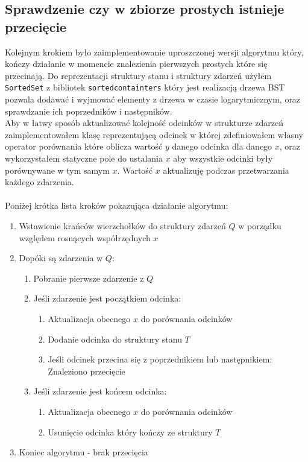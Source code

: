 \documentclass[a4paper]{article}
\begin{document}
\subsection{Sprawdzenie czy w zbiorze prostych istnieje przecięcie}
    Kolejnym krokiem było zaimplementowanie uproszczonej wersji algorytmu który, kończy działanie w momencie 
    znalezienia pierwszych prostych które się przecinają. Do reprezentacji struktury stanu i struktury zdarzeń
    użyłem \verb|SortedSet| z bibliotek \verb|sortedcontainters| który jest realizacją drzewa BST 
    pozwala dodawać i wyjmować elementy z drzewa w czasie logarytmicznym, oraz sprawdzanie ich poprzedników 
    i następników.\\
    Aby w łatwy sposób aktualizować kolejność odcinków w strukturze zdarzeń zaimplementowałem klasę reprezentującą
    odcinek w której zdefiniowałem własny operator porównania które oblicza wartość $y$ danego odcinka dla danego $x$,
    oraz wykorzystałem statyczne pole do ustalania $x$ aby wszystkie odcinki były porównywane w tym samym $x$. 
    Wartość $x$ aktualizuję podczas przetwarzania każdego zdarzenia.\\
    \\
    Poniżej krótka lista kroków pokazująca działanie algorytmu:
    
    \begin{enumerate}
        \item Wstawienie krańców wierzchołków do struktury zdarzeń $Q$ w porządku względem rosnących współrzędnych $x$
        \item Dopóki są zdarzenia w $Q$:
            \begin{enumerate}
                \item Pobranie pierwsze zdarzenie z $Q$
                \item Jeśli zdarzenie jest początkiem odcinka:
                    \begin{enumerate}
                        \item Aktualizacja obecnego $x$ do porównania odcinków 
                        \item Dodanie odcinka do struktury stanu $T$
                        \item Jeśli odcinek przecina się z poprzednikiem lub następnikiem: Znaleziono przecięcie
                    \end{enumerate}
                \item Jeśli zdarzenie jest końcem odcinka:
                    \begin{enumerate}
                        \item Aktualizacja obecnego $x$ do porównania odcinków 
                        \item Usunięcie odcinka który kończy ze struktury $T$
                    \end{enumerate}
            \end{enumerate}
        \item Koniec algorytmu - brak przecięcia
    \end{enumerate}
\end{document}
